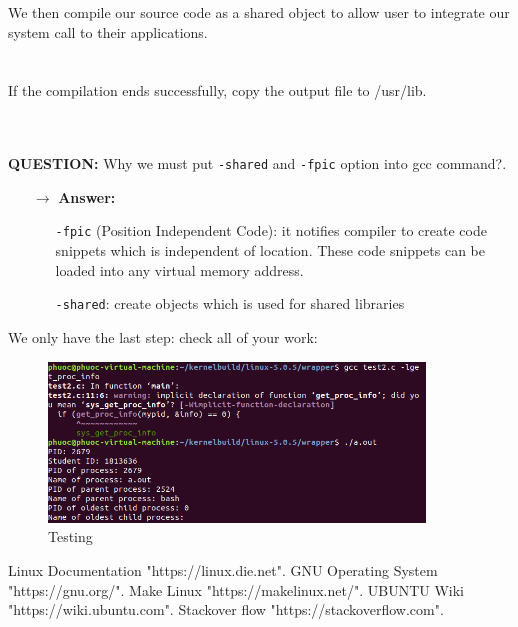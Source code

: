 \documentclass[a4paper]{article}
\begin{document}
We then compile our source code as a shared object to allow user to integrate our system call to their applications.\\
\noindent{}\\
\\
If the compilation ends successfully, copy the output file to /usr/lib.\\
\noindent{}\\
\\
\begin{mdframed}[hidealllines=true,backgroundcolor=blue!10]
\textbf{QUESTION:} Why we must put \texttt{-shared} and \texttt{-fpic} option into gcc command?. 
\begin{itemize}
\item[$\rightarrow$] \textbf{Answer:}
\begin{itemize}
\item[\textbullet] \texttt{-fpic} (Position Independent Code): it notifies compiler to create code snippets which is independent of location. These code snippets can be loaded into any virtual memory address.
\item[\textbullet] \texttt{-shared}: create objects which is used for shared libraries
\end{itemize}
\end{itemize}
\end{mdframed}
We only have the last step: check all of your work:\\
\begin{figure}[h!]
\begin{center}
\includegraphics[width=10cm]{10.png}
\caption{Testing}
\end{center}
\end{figure}
\newpage
\begin{thebibliography}{80}
Linux Documentation "https://linux.die.net".
GNU Operating System "https://gnu.org/".
Make Linux "https://makelinux.net/".
UBUNTU Wiki "https://wiki.ubuntu.com".
Stackover flow "https://stackoverflow.com".
\end{thebibliography}
\end{document}
